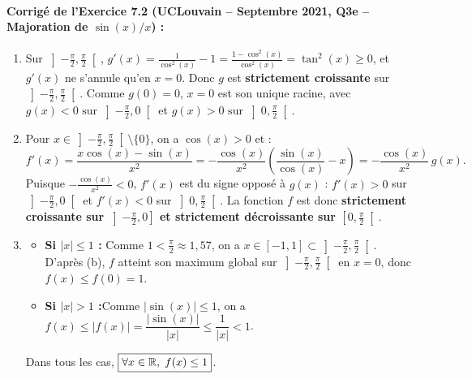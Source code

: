 \paragraph{Corrigé de l'Exercice 7.2 (UCLouvain -- Septembre 2021, Q3e -- Majoration de $\sin(x)/x$) :}
\begin{enumerate}[label=(\alph*)]
    \item Sur $\left]-\frac{\pi}{2}, \frac{\pi}{2}\right[$, $g'(x) = \frac{1}{\cos^2(x)} - 1 = \frac{1-\cos^2(x)}{\cos^2(x)} = \tan^2(x) \ge 0$, et $g'(x)$ ne s'annule qu'en $x = 0$. Donc $g$ est \textbf{strictement croissante} sur $\left]-\frac{\pi}{2}, \frac{\pi}{2}\right[$. Comme $g(0) = 0$, $x = 0$ est son unique racine, avec $\boxed{g(x) < 0 \text{ sur } \left]-\frac{\pi}{2}, 0\right[}$ et $\boxed{g(x) > 0 \text{ sur } \left]0, \frac{\pi}{2}\right[}$.
    \item Pour $x \in \left]-\frac{\pi}{2}, \frac{\pi}{2}\right[ \setminus \{0\}$, on a $\cos(x) > 0$ et :
    \[
        f'(x) = \frac{x\cos(x) - \sin(x)}{x^2} = -\frac{\cos(x)}{x^2}\left(\frac{\sin(x)}{\cos(x)} - x\right) = -\frac{\cos(x)}{x^2}\,g(x).
    \]
    Puisque $-\frac{\cos(x)}{x^2} < 0$, $f'(x)$ est du signe opposé à $g(x)$ : $f'(x) > 0$ sur $\left]-\frac{\pi}{2}, 0\right[$ et $f'(x) < 0$ sur $\left]0, \frac{\pi}{2}\right[$. La fonction $f$ est donc \textbf{strictement croissante sur $\left]-\frac{\pi}{2}, 0\right]$ et strictement décroissante sur $\left[0, \frac{\pi}{2}\right[$}.
    \item \begin{itemize}
        \item \textbf{Si $|x| \le 1$ :} Comme $1 < \frac{\pi}{2} \approx 1,57$, on a $x \in [-1, 1] \subset \left]-\frac{\pi}{2}, \frac{\pi}{2}\right[$. D'après (b), $f$ atteint son maximum global sur $\left]-\frac{\pi}{2}, \frac{\pi}{2}\right[$ en $x = 0$, donc $f(x) \le f(0) = 1$.
        \item \textbf{Si $|x| > 1$ :}Comme $|\sin(x)| \le 1$, on a $f(x) \le |f(x)| = \dfrac{|\sin(x)|}{|x|} \le \dfrac{1}{|x|} < 1$.
    \end{itemize}
    Dans tous les cas, $\boxed{\forall x \in \mathbb{R},\; f(x) \le 1}$.
\end{enumerate}

